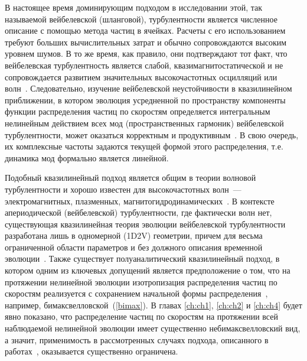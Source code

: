 В настоящее время доминирующим подходом в исследовании этой, так называемой вейбелевской (шланговой), турбулентности является численное описание с помощью метода частиц в ячейках. 
Расчеты с его использованием требуют больших вычислительных затрат и обычно сопровождаются высоким уровнем шумов. 
В то же время, как правило, они подтверждают тот факт, что вейбелевская турбулентность является слабой, квазимагнитостатической и не сопровождается развитием значительных высокочастотных осцилляций или волн~\cite{Morse1971,Yang1994,Califano2006, Borodachev2010,Borodachev2016_Radiofiz,Huntington2015,Dieckmann2019,Kocharovsky2024,Korzhimanov2025}.
Следовательно, изучение вейбелевской неустойчивости в квазилинейном приближении, в котором эволюция усредненной по пространству компоненты функции распределения частиц по скоростям определяется интегральным нелинейным действием всех мод (пространственных гармоник) вейбелевской турбулентности, может оказаться корректным и продуктивным~\cite{GaleevSagdeev1969,Davidson1972,Pokhotelov2011,Ruyer2015}. 
В свою очередь, их комплексные частоты задаются текущей формой этого распределения, т.е. динамика мод формально является линейной.

Подобный квазилинейный подход является общим в теории волновой турбулентности и хорошо известен для высокочастотных волн~--- электромагнитных, плазменных, магнитогидродинамических~\cite{Vedenov1963,GaleevSagdeev1969,Tsytovich1966,Zakharov1972,Wu1968,Yoon2017,Shaaban2021}. 
В контексте апериодической (вейбелевской) турбулентности, где фактически волн нет, существующая квазилинейная теория эволюции вейбелевской турбулентности разработана лишь в одномерной (1D2V) геометрии, причем для весьма ограниченной области параметров и без должного описания временной эволюции~\cite{Pokhotelov2011,GaleevSagdeev1969}. 
Также существует полуаналитический квазилинейный подход, в котором одним из ключевых допущений является предположение о том, что на протяжении нелинейной эволюции изотропизация распределения частиц по скоростям реализуется с сохранением начальной формы распределения~\cite{Seough2015b,Seough2015a,Ruyer2015,StockemNovo2015}, например, бимаксвелловской~(\ref{bimax}).
В главах \ref{ch:ch1}, \ref{ch:ch2} и \ref{ch:ch4} будет явно показано, что распределение частиц по скоростям на протяжении всей наблюдаемой нелинейной эволюции имеет существенно небимаксвелловский вид, а значит, применимость в рассмотренных случаях подхода, описанного в работах~\cite{Seough2015b,Seough2015a,Ruyer2015,StockemNovo2015}, оказывается существенно ограничена.

